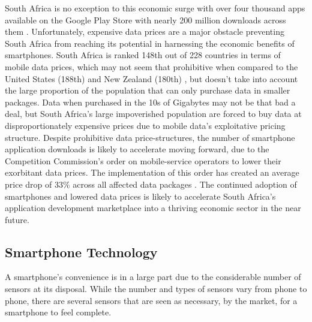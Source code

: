 South Africa is no exception to this economic surge with over four thousand apps available on the Google Play Store with nearly 200 million downloads across them \cite{42matters}. Unfortunately, expensive data prices are a major obstacle preventing South Africa from reaching its potential in harnessing the economic benefits of smartphones. South Africa is ranked 148th out of 228 countries in terms of mobile data prices, which may not seem that prohibitive when compared to the United States (188th) and New Zealand (180th) \cite{Cable.co.uk}, but doesn’t take into account the large proportion of the population that can only purchase data in smaller packages. Data when purchased in the 10s of Gigabytes may not be that bad a deal, but South Africa’s large impoverished population are forced to buy data at disproportionately expensive prices due to mobile data’s exploitative pricing structure. 
Despite prohibitive data price-structures, the number of smartphone application downloads is likely to accelerate moving forward, due to the Competition Commission’s order on mobile-service operators to lower their exorbitant data prices. The implementation of this order has created an average price drop of 33\% across all affected data packages \cite{Bottomley2020}. The continued adoption of smartphones and lowered data prices is likely to accelerate South Africa’s application development marketplace into a thriving economic sector in the near future.

\subsection{Smartphone Technology}
A smartphone’s convenience is in a large part due to the considerable number of sensors at its disposal. While the number and types of sensors vary from phone to phone, there are several sensors that are seen as necessary, by the market, for a smartphone to feel complete. 

